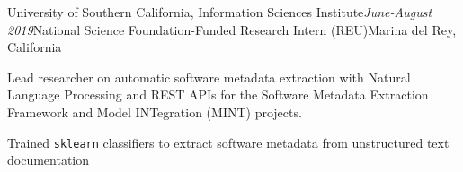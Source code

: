 \begin{rSubsection}{University of Southern California, Information Sciences Institute}{\em June-August 2019}{National Science Foundation-Funded Research Intern (REU)}{Marina del Rey, California}
\item Lead researcher on automatic software metadata extraction  with Natural Language Processing and REST APIs for the Software Metadata Extraction Framework and Model INTegration (MINT) projects.
\item Trained \texttt{sklearn} classifiers to extract software metadata from unstructured text documentation 
\end{rSubsection}